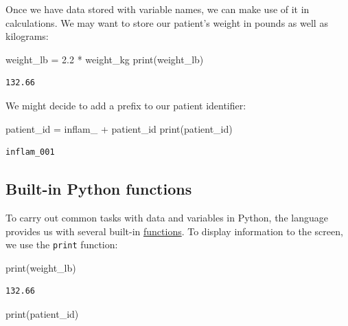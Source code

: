 \documentclass[
  letterpaper,
  DIV=11,
  numbers=noendperiod]{scrartcl}
\newenvironment{Shaded}{\begin{snugshade}}{\end{snugshade}}
\newcommand{\BuiltInTok}[1]{\textcolor[rgb]{0.00,0.23,0.31}{#1}}
\newcommand{\FloatTok}[1]{\textcolor[rgb]{0.68,0.00,0.00}{#1}}
\newcommand{\NormalTok}[1]{\textcolor[rgb]{0.00,0.23,0.31}{#1}}
\newcommand{\OperatorTok}[1]{\textcolor[rgb]{0.37,0.37,0.37}{#1}}
\newcommand{\StringTok}[1]{\textcolor[rgb]{0.13,0.47,0.30}{#1}}
\begin{document}
Once we have data stored with variable names, we can make use of it in
calculations. We may want to store our patient's weight in pounds as
well as kilograms:

\begin{Shaded}
\begin{Highlighting}[]
\NormalTok{weight\_lb }\OperatorTok{=} \FloatTok{2.2} \OperatorTok{*}\NormalTok{ weight\_kg}
\BuiltInTok{print}\NormalTok{(weight\_lb)}
\end{Highlighting}
\end{Shaded}

\begin{verbatim}
132.66
\end{verbatim}

We might decide to add a prefix to our patient identifier:

\begin{Shaded}
\begin{Highlighting}[]
\NormalTok{patient\_id }\OperatorTok{=} \StringTok{\textquotesingle{}inflam\_\textquotesingle{}} \OperatorTok{+}\NormalTok{ patient\_id}
\BuiltInTok{print}\NormalTok{(patient\_id)}
\end{Highlighting}
\end{Shaded}

\begin{verbatim}
inflam_001
\end{verbatim}

\subsection{Built-in Python functions}\label{built-in-python-functions}

To carry out common tasks with data and variables in Python, the
language provides us with several built-in
\href{../learners/reference.md\#function}{functions}. To display
information to the screen, we use the \texttt{print} function:

\begin{Shaded}
\begin{Highlighting}[]
\BuiltInTok{print}\NormalTok{(weight\_lb)}
\end{Highlighting}
\end{Shaded}

\begin{verbatim}
132.66
\end{verbatim}

\begin{Shaded}
\begin{Highlighting}[]
\BuiltInTok{print}\NormalTok{(patient\_id)}
\end{Highlighting}
\end{Shaded}
\end{document}

